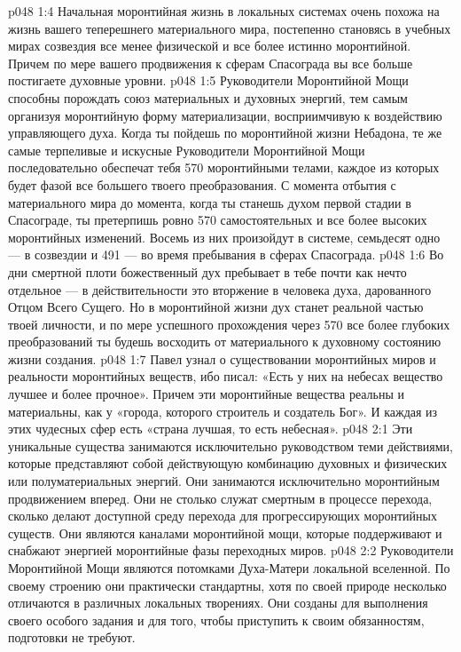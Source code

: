 \vs p048 1:4 \pc Начальная моронтийная жизнь в локальных системах очень похожа на жизнь вашего теперешнего материального мира, постепенно становясь в учебных мирах созвездия все менее физической и все более истинно моронтийной. Причем по мере вашего продвижения к сферам Спасограда вы все больше постигаете духовные уровни.
\vs p048 1:5 Руководители Моронтийной Мощи способны порождать союз материальных и духовных энергий, тем самым организуя моронтийную форму материализации, восприимчивую к воздействию управляющего духа. Когда ты пойдешь по моронтийной жизни Небадона, те же самые терпеливые и искусные Руководители Моронтийной Мощи последовательно обеспечат тебя 570 моронтийными телами, каждое из которых будет фазой все большего твоего преобразования. С момента отбытия с материального мира до момента, когда ты станешь духом первой стадии в Спасограде, ты претерпишь ровно 570 самостоятельных и все более высоких моронтийных изменений. Восемь из них произойдут в системе, семьдесят одно --- в созвездии и 491 --- во время пребывания в сферах Спасограда.
\vs p048 1:6 Во дни смертной плоти божественный дух пребывает в тебе почти как нечто отдельное --- в действительности это вторжение в человека духа, дарованного Отцом Всего Сущего. Но в моронтийной жизни дух станет реальной частью твоей личности, и по мере успешного прохождения через 570 все более глубоких преобразований ты будешь восходить от материального к духовному состоянию жизни создания.
\vs p048 1:7 \pc Павел узнал о существовании моронтийных миров и реальности моронтийных веществ, ибо писал: «Есть у них на небесах вещество лучшее и более прочное». Причем эти моронтийные вещества реальны и материальны, как у «города, которого строитель и создатель Бог». И каждая из этих чудесных сфер есть «страна лучшая, то есть небесная».
\vs p048 2:1 Эти уникальные существа занимаются исключительно руководством теми действиями, которые представляют собой действующую комбинацию духовных и физических или полуматериальных энергий. Они занимаются исключительно моронтийным продвижением вперед. Они не столько служат смертным в процессе перехода, сколько делают доступной среду перехода для прогрессирующих моронтийных существ. Они являются каналами моронтийной мощи, которые поддерживают и снабжают энергией моронтийные фазы переходных миров.
\vs p048 2:2 Руководители Моронтийной Мощи являются потомками Духа\hyp{}Матери локальной вселенной. По своему строению они практически стандартны, хотя по своей природе несколько отличаются в различных локальных творениях. Они созданы для выполнения своего особого задания и для того, чтобы приступить к своим обязанностям, подготовки не требуют.
